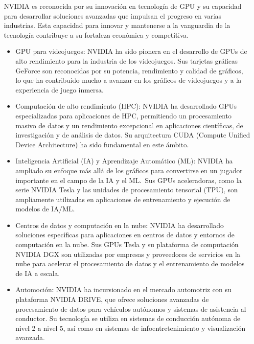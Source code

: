 \documentclass[twocolumn, 12pt]{article}
\begin{document}
NVIDIA es reconocida por su innovación en tecnología de GPU y su
capacidad para desarrollar soluciones avanzadas que impulsan el
progreso en varias industrias. Esta capacidad para innovar y
mantenerse a la vanguardia de la tecnología contribuye a su
fortaleza económica y competitiva.

\begin{itemize}
      \item GPU para videojuegos:
            NVIDIA ha sido pionera en el desarrollo de GPUs de alto rendimiento
            para la industria de los videojuegos. Sus tarjetas gráficas GeForce
            son reconocidas por su potencia, rendimiento y calidad de gráficos,
            lo que ha contribuido mucho a avanzar en los gráficos de videojuegos
            y a la experiencia de juego inmersa.

      \item Computación de alto rendimiento (HPC):
            NVIDIA ha desarrollado GPUs especializadas para aplicaciones de HPC,
            permitiendo un procesamiento masivo de datos y un rendimiento
            excepcional en aplicaciones científicas, de investigación y de
            análisis de datos. Su arquitectura CUDA
            (Compute Unified Device Architecture) ha sido fundamental en este
            ámbito.

      \item Inteligencia Artificial (IA) y Aprendizaje Automático (ML):
            NVIDIA ha ampliado su enfoque más allá de los gráficos para
            convertirse en un jugador importante en el campo de la IA y
            el ML.~Sus GPUs aceleradoras, como la serie NVIDIA Tesla y las
            unidades de procesamiento tensorial (TPU), son ampliamente utilizadas
            en aplicaciones de entrenamiento y ejecución de modelos de IA/ML.\@{}

      \item Centros de datos y computación en la nube:
            NVIDIA ha desarrollado soluciones específicas para aplicaciones
            en centros de datos y entornos de computación en la nube. Sus
            GPUs Tesla y su plataforma de computación NVIDIA DGX son
            utilizadas por empresas y proveedores de servicios en la nube para
            acelerar el procesamiento de datos y el entrenamiento de modelos
            de IA a escala.

      \item Automoción:
            NVIDIA ha incursionado en el mercado automotriz con su plataforma
            NVIDIA DRIVE, que ofrece soluciones avanzadas de procesamiento
            de datos para vehículos autónomos y sistemas de asistencia al
            conductor. Su tecnología se utiliza en sistemas de conducción
            autónoma de nivel 2 a nivel 5, así como en sistemas de
            infoentretenimiento y visualización avanzada.


\end{itemize}
\end{document}
